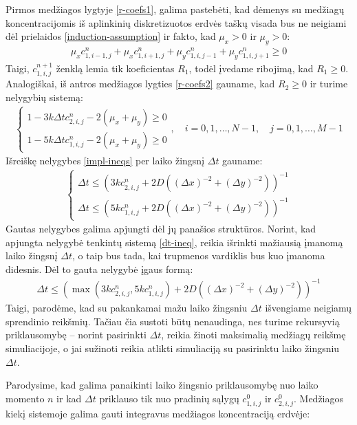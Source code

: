 \newpage
Pirmos medžiagos lygtyje \eqref{r-coefs1}, galima pastebėti, kad dėmenys su medžiagų koncentracijomis iš aplinkinių diskretizuotos erdvės taškų visada bus ne neigiami dėl prielaidos \eqref{induction-assumption} ir fakto, kad $\mu_x>0$ ir $\mu_y>0$:
\begin{align*}
  \mu_xc^n_{1,i-1,j}+\mu_xc^n_{1,i+1,j}+\mu_yc^n_{1,i,j-1}+\mu_yc^n_{1,i,j+1}\geqslant 0
\end{align*}
Taigi, $c^{n+1}_{1,i,j}$ ženklą lemia tik koeficientas $R_1$, todėl įvedame ribojimą, kad $R_1\geqslant 0$. Analogiškai, iš antros medžiagos lygties \eqref{r-coefs2} gauname, kad $R_2\geqslant 0$ ir turime nelygybių sistemą:
\begin{align} \label{impl-ineqs}
  \begin{cases}
    1-3k\Delta tc^{n}_{2,i,j}-2(\mu_x+\mu_y)\geqslant 0\\
    1-5k\Delta tc^{n}_{1,i,j}-2(\mu_x+\mu_y)\geqslant 0
  \end{cases}, \quad i=0,1,\dots,N-1, \quad j=0,1,\dots,M-1
\end{align}
Išreiškę nelygybes \eqref{impl-ineqs} per laiko žingsnį $\Delta t$ gauname:
\begin{align} \label{dt-ineq}
  \begin{cases}
    \Delta t \leqslant (3kc^{n}_{2,i,j}+2D((\Delta x)^{-2}+(\Delta y)^{-2}))^{-1}\\
    \Delta t \leqslant (5kc^{n}_{1,i,j}+2D((\Delta x)^{-2}+(\Delta y)^{-2}))^{-1}
  \end{cases}
\end{align}
Gautas nelygybes galima apjungti dėl jų panašios struktūros. Norint, kad apjungta nelygybė tenkintų sistemą \eqref{dt-ineq}, reikia išrinkti mažiausią įmanomą laiko žingsnį $\Delta t$, o taip bus tada, kai trupmenos vardiklis bus kuo įmanoma didesnis. Dėl to gauta nelygybė įgaus formą:
\begin{align}
  \Delta t \leqslant \left(\max(3kc^{n}_{2,i,j}, 5kc^{n}_{1,i,j})+2D\left((\Delta x)^{-2}+(\Delta y)^{-2}\right)\right)^{-1}
\end{align}
Taigi, parodėme, kad su pakankamai mažu laiko žingsniu $\Delta t$ išvengiame neigiamų sprendinio reikšmių. Tačiau čia sustoti būtų nenaudinga, nes turime rekursyvią priklausomybę -- norint pasirinkti $\Delta t$, reikia žinoti maksimalią medžiagų reikšmę simuliacijoje, o jai sužinoti reikia atlikti simuliaciją su pasirinktu laiko žingsniu $\Delta t$.

Parodysime, kad galima panaikinti laiko žingsnio priklausomybę nuo laiko momento $n$ ir kad $\Delta t$ priklauso tik nuo pradinių sąlygų $c^0_{1,i,j}$ ir $c^0_{2,i,j}$. Medžiagos kiekį sistemoje galima gauti integravus medžiagos koncentraciją erdvėje:

